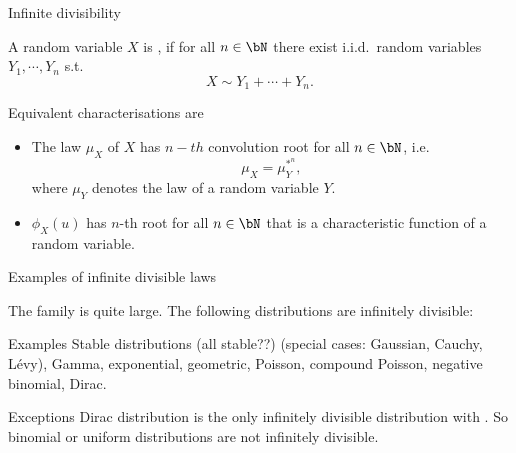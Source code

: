 \begin{frame}
    {Infinite divisibility}

    \begin{definition}
        A random variable $X$ is , if for all $n\in\bN$
        there exist i.i.d.\ random variables $Y_1, \cdots, Y_n$ s.t.\
        \begin{equation*}
            X \sim Y_1 + \cdots + Y_n. 
        \end{equation*}
    \end{definition}

    Equivalent characterisations are
    \begin{itemize}
        \item The law $\mu_X$ of $X$ has $n-th$ convolution root for all 
            $n\in\bN$, i.e. 
            \begin{equation*}
                \mu_X = \mu_Y^{*^{n}}, 
            \end{equation*}
            where $\mu_Y$ denotes the law of a random variable $Y$.  
        \item $\phi_X(u)$ has $n$-th root for all $n\in\bN$ that is
            a characteristic function of a random variable. 
    \end{itemize}
\end{frame}


\begin{frame}
    {Examples of infinite divisible laws}

    The family is quite large. The following distributions are infinitely divisible:

    \begin{block}{Examples}
        Stable distributions (all stable??) (special cases: Gaussian, Cauchy,
        L\'evy), Gamma, exponential, geometric, Poisson, compound Poisson,
        negative binomial, Dirac.
    \end{block}

    \begin{block}{Exceptions}
        Dirac distribution is the only infinitely divisible distribution with
        \key{bounded support}. 
        So binomial or uniform distributions are not infinitely divisible.
    \end{block}
\end{frame}

